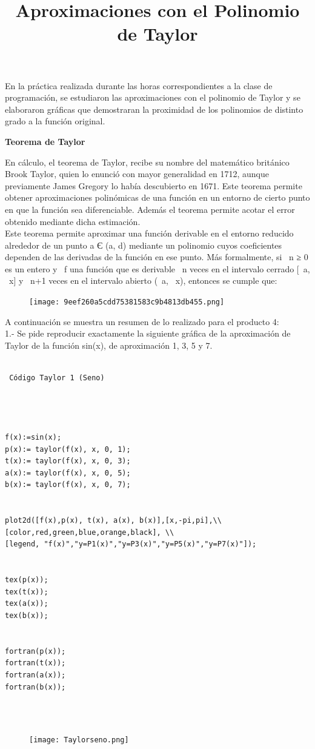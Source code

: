 \documentclass[12pt]{article}
\title{\Reporte Aproximaciones con el Polinomio de Taylor}
\date{}
\begin{document}
 En la práctica realizada durante las horas correspondientes a la clase de programación, se estudiaron las aproximaciones con el polinomio de Taylor y se elaboraron gráficas que demostraran la proximidad de los polinomios de distinto grado a la función original.\\
  \begin{center} \textbf{  Teorema de Taylor } \end{center}
   En cálculo, el teorema de Taylor, recibe su nombre del matemático británico Brook Taylor, quien lo enunció con mayor generalidad en 1712, aunque previamente James Gregory lo había descubierto en 1671. Este teorema permite obtener aproximaciones polinómicas de una función en un entorno de cierto punto en que la función sea diferenciable. Además el teorema permite acotar el error obtenido mediante dicha estimación.\\
   Este teorema permite aproximar una función derivable en el entorno reducido alrededor de un punto a Є (a, d) mediante un polinomio cuyos coeficientes dependen de las derivadas de la función en ese punto. Más formalmente, si \ n ≥ 0 es un entero y \ f una función que es derivable \ n veces en el intervalo cerrado [\ a, \ x] y \ n+1 veces en el intervalo abierto (\ a, \ x), entonces se cumple que:\\
   \begin{center}
   \begin{figure}[h]
\texttt{[image: 9eef260a5cdd75381583c9b4813db455.png]}
\end{figure}
 \end{center}
 
 A continuación se muestra un resumen de lo realizado para el producto 4:\\
 
 
 1.-  Se pide reproducir exactamente la siguiente gráfica de la aproximación de Taylor de la función sin(x), de aproximación 1, 3, 5 y 7.
 
 \begin{verbatim}
 
 Código Taylor 1 (Seno)




f(x):=sin(x);
p(x):= taylor(f(x), x, 0, 1);
t(x):= taylor(f(x), x, 0, 3);
a(x):= taylor(f(x), x, 0, 5);
b(x):= taylor(f(x), x, 0, 7);


plot2d([f(x),p(x), t(x), a(x), b(x)],[x,-pi,pi],\\
[color,red,green,blue,orange,black], \\
[legend, "f(x)","y=P1(x)","y=P3(x)","y=P5(x)","y=P7(x)"]);


tex(p(x));
tex(t(x));
tex(a(x));
tex(b(x));


fortran(p(x));
fortran(t(x));
fortran(a(x));
fortran(b(x));


      \end{verbatim}\\
 \begin{center}
  \begin{figure}[b]
\texttt{[image: Taylorseno.png]}
\end{figure}
\end{center}\\
  \newpage
  
\end{document}
